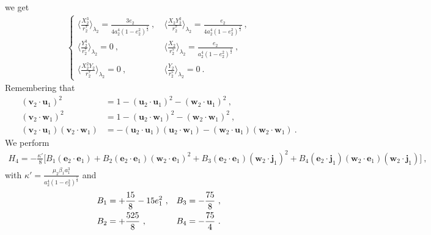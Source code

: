 \documentclass[a4paper]{article}
\begin{document}
we get
\begin{align}
\begin{cases}
 \langle \frac{X_{2}^{3}}{r_{2}^{7}} \rangle _{\lambda_{2}}=\frac{3e_{2}}{4a_{2}^{4}(1-e_{2}^{2})^{\frac{5}{2}}}  \ , \  &\langle \frac{X_{2}Y_{2}^{2}}{r_{2}^{7}} \rangle _{\lambda_{2}}=\frac{e_{2}}{4a_{2}^{4}(1-e_{2}^{2})^{\frac{5}{2}}} \ , \\
 \langle \frac{Y_{2}^{3}}{r_{2}^{7}} \rangle _{\lambda_{2}}=0 \ , \ &\langle \frac{X_{2}}{r_{2}^{5}} \rangle _{\lambda_{2}}=\frac{e_{2}}{a_{2}^{4}(1-e_{2}^{2})^{\frac{5}{2}}} \ , \\
 \langle \frac{X_{2}^{2}Y_{2}}{r_{2}^{7}} \rangle _{\lambda_{2}}=0 \ , \ &\langle \frac{Y_{2}}{r_{2}^{5}} \rangle _{\lambda_{2}}=0 \ .
 \end{cases}
\end{align}
Remembering that
\begin{align}
(\mathbf v_{2} \cdot \mathbf u_{1})^{2}&=1-(\mathbf u_{2} \cdot \mathbf u_{1})^{2}-(\mathbf w_{2} \cdot \mathbf u_{1})^{2} \ , \\
(\mathbf v_{2} \cdot \mathbf w_{1})^{2}&=1-(\mathbf u_{2} \cdot \mathbf w_{1})^{2}-(\mathbf w_{2} \cdot \mathbf w_{1})^{2} \ , \\
(\mathbf v_{2} \cdot \mathbf u_{1})(\mathbf v_{2} \cdot \mathbf w_{1})&=-(\mathbf u_{2} \cdot \mathbf u_{1})(\mathbf u_{2} \cdot \mathbf w_{1})-(\mathbf w_{2} \cdot \mathbf u_{1})(\mathbf w_{2} \cdot \mathbf w_{1}) \ .
\end{align}
We perform
\begin{align}
H_{4}=-\frac{\kappa'}{8} \bigg[
 B_{1}(\mathbf e_{2} \cdot \mathbf e_{1})
+B_{2}(\mathbf e_{2} \cdot \mathbf e_{1})(\mathbf w_{2} \cdot \mathbf e_{1})^{2} 
+B_{3}(\mathbf e_{2} \cdot \mathbf e_{1})(\mathbf w_{2} \cdot \mathbf j_{1})^{2}
+B_{4}(\mathbf e_{2} \cdot \mathbf j_{1})(\mathbf w_{2} \cdot \mathbf e_{1})(\mathbf w_{2} \cdot \mathbf j_{1})
\bigg ] \ ,
\end{align}
with $\kappa'=\frac{\mu_{2}\beta_{1}a_{1}^{3}}{a_{2}^{4}(1-e_{2}^{2})^{\frac{5}{2}}}$ and
\begin{align}
B_{1}&=+\frac{15}{8}-15e_{1}^{2} \ , &B_{3}&=-\frac{75}{8}   \ , \notag \\
B_{2}&=+\frac{525}{8}   \ ,                    &B_{4}&=-\frac{75}{4}    \ .
\end{align}

\newpage



\end{document}
